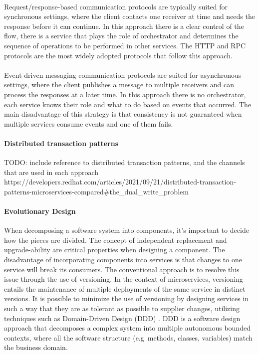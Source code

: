 \paragraph{}

Request/response-based communication protocols are typically suited for synchronous settings,
where the client contacts one receiver at time and needs the response before it can continue.
In this approach there is a clear control of the flow,
there is a service that plays the role of orchestrator and determines the sequence of operations to be performed in other services.
The HTTP and RPC protocols are the most widely adopted protocols that follow this approach.

\paragraph{}

Event-driven messaging communication protocols are suited for asynchronous settings,
where the client publishes a message to multiple receivers and can process the responses at a later time.
In this approach there is no orchestrator, each service knows their role and what to do based on events that occurred.
The main disadvantage of this strategy is that consistency is not guaranteed when multiple services consume events and one of them fails.

\paragraph{Distributed transaction patterns}

TODO: include reference to distributed transaction patterns, and the channels that are used in each approach https://developers.redhat.com/articles/2021/09/21/distributed-transaction-patterns-microservices-compared#the_dual_write_problem

\paragraph{Evolutionary Design}
When decomposing a software system into components, it's important to decide how the pieces are divided.
The concept of independent replacement and upgrade-ability are critical properties when designing a component.
The disadvantage of incorporating components into services is that changes to one service will break its consumers.
The conventional approach is to resolve this issue through the use of versioning.
In the context of microservices, versioning entails the maintenance of multiple deployments of the same service in distinct versions.
It is possible to minimize the use of versioning by designing services in such a way that they are as tolerant as possible to supplier changes,
utilizing techniques such as Domain-Driven Design (DDD) \cite{ddd}.
DDD is a software design approach that decomposes a complex system into multiple autonomous bounded contexts,
where all the software structure (e.g\ methods, classes, variables) match the business domain.

